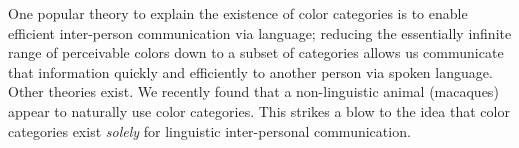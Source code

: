 One popular theory to explain the existence of color categories is to enable efficient inter-person communication via language; reducing the essentially infinite range of perceivable colors down to a subset of categories allows us communicate that information quickly and efficiently to another person via spoken language.
Other theories exist.
We recently found that a non-linguistic animal (macaques) appear to naturally use color categories. 
This strikes a blow to the idea that color categories exist \emph{solely} for linguistic inter-personal communication.